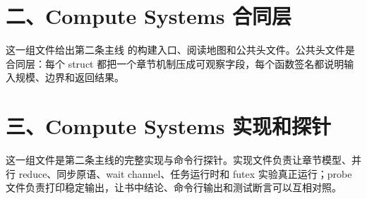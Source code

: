 \section*{二、Compute Systems 合同层}

这一组文件给出第二条主线  的构建入口、阅读地图和公共头文件。公共头文件是合同层：每个 struct 都把一个章节机制压成可观察字段，每个函数签名都说明输入规模、边界和返回结果。

















\section*{三、Compute Systems 实现和探针}

这一组文件是第二条主线的完整实现与命令行探针。实现文件负责让章节模型、并行 reduce、同步原语、wait channel、任务运行时和 futex 实验真正运行；probe 文件负责打印稳定输出，让书中结论、命令行输出和测试断言可以互相对照。



